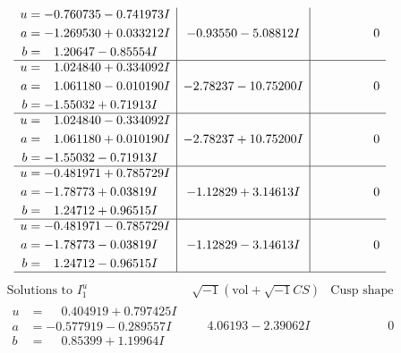 \documentclass[1p]{elsarticle_modified}
\theoremstyle{definition}
\newcommand{\I}{\sqrt{-1}}
\begin{document}
$$\begin{array}{c|c|c}
\begin{aligned}
u &= -0.760735 - 0.741973 I \\
a &= -1.269530 + 0.033212 I \\
b &= \phantom{-}1.20647 - 0.85554 I\end{aligned}
 & -0.93550 - 5.08812 I & \phantom{-0.000000 } 0 \\ \hline\begin{aligned}
u &= \phantom{-}1.024840 + 0.334092 I \\
a &= \phantom{-}1.061180 - 0.010190 I \\
b &= -1.55032 + 0.71913 I\end{aligned}
 & -2.78237 - 10.75200 I & \phantom{-0.000000 } 0 \\ \hline\begin{aligned}
u &= \phantom{-}1.024840 - 0.334092 I \\
a &= \phantom{-}1.061180 + 0.010190 I \\
b &= -1.55032 - 0.71913 I\end{aligned}
 & -2.78237 + 10.75200 I & \phantom{-0.000000 } 0 \\ \hline\begin{aligned}
u &= -0.481971 + 0.785729 I \\
a &= -1.78773 + 0.03819 I \\
b &= \phantom{-}1.24712 + 0.96515 I\end{aligned}
 & -1.12829 + 3.14613 I & \phantom{-0.000000 } 0 \\ \hline\begin{aligned}
u &= -0.481971 - 0.785729 I \\
a &= -1.78773 - 0.03819 I \\
b &= \phantom{-}1.24712 - 0.96515 I\end{aligned}
 & -1.12829 - 3.14613 I & \phantom{-0.000000 } 0\\
 \hline 
 \end{array}$$\newpage$$\begin{array}{c|c|c}  
\text{Solutions to }I^u_{1}& \I (\text{vol} + \sqrt{-1}CS) & \text{Cusp shape}\\
 \hline 
\begin{aligned}
u &= \phantom{-}0.404919 + 0.797425 I \\
a &= -0.577919 - 0.289557 I \\
b &= \phantom{-}0.85399 + 1.19964 I\end{aligned}
 & \phantom{-}4.06193 - 2.39062 I & \phantom{-0.000000 } 0 \\ \hline\begin{aligned}

\end{aligned}
\end{array}$$
\end{document}
